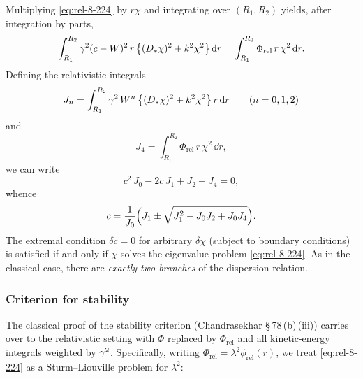 Multiplying \eqref{eq:rel-8-224} by $r\chi$ and integrating over
$(R_{1},R_{2})$ yields, after integration by parts,
\begin{equation}
\label{eq:rel-8-227}
\int_{R_{1}}^{R_{2}} \gamma^{2}(c-W)^{2}\,r\,
  \bigl\{(D_{*}\chi)^{2}+k^{2}\chi^{2}\bigr\}\,\mathrm{d} r
  = \int_{R_{1}}^{R_{2}}\Phi_{\mathrm{rel}}\,r\,\chi^{2}\,\mathrm{d} r.
\end{equation}
Defining the relativistic integrals
\begin{equation}
\label{eq:rel-8-228}
J_{n} = \int_{R_{1}}^{R_{2}} \gamma^{2}\,W^{n}\,
  \bigl\{(D_{*}\chi)^{2}+k^{2}\chi^{2}\bigr\}\,r\,\mathrm{d} r
  \qquad (n=0,1,2)
\end{equation}
and
\begin{equation}
\label{eq:rel-8-229}
J_{4} = \int_{R_{1}}^{R_{2}}\Phi_{\mathrm{rel}}\,r\,\chi^{2}\,\dd r,
\end{equation}
we can write
\begin{equation}
\label{eq:rel-8-230}
c^{2}\,J_{0} - 2c\,J_{1} + J_{2} - J_{4} = 0,
\end{equation}
whence
\begin{equation}
\label{eq:rel-8-231}
c = \frac{1}{J_{0}}
  \Bigl(J_{1}\pm\sqrt{J_{1}^{2}-J_{0}J_{2}+J_{0}J_{4}}\Bigr).
\end{equation}
The extremal condition $\delta c = 0$ for arbitrary $\delta\chi$
(subject to boundary conditions) is satisfied if and only if $\chi$
solves the eigenvalue problem \eqref{eq:rel-8-224}.  As in the
classical case, there are \emph{exactly two branches} of the
dispersion relation.

\subsubsection{Criterion for stability}
\label{sec:rel-8-79c-ii}

The classical proof of the stability criterion
(Chandrasekhar \S\,78\,(b)\,(iii)) carries over to the relativistic
setting with $\Phi$ replaced by $\Phi_{\mathrm{rel}}$ and
all kinetic-energy integrals weighted by $\gamma^{2}$.  Specifically,
writing $\Phi_{\mathrm{rel}}=\lambda^{2}\phi_{\mathrm{rel}}(r)$,
we treat \eqref{eq:rel-8-224} as a Sturm--Liouville problem for
$\lambda^{2}$:

